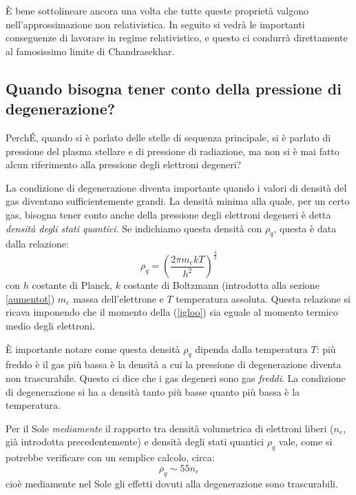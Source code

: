 \smallskip

\`E bene sottolineare ancora una volta che tutte queste propriet\`{a} valgono nell'approssimazione non relativistica. In seguito si vedr\`{a} le importanti conseguenze di lavorare in regime relativistico, e questo ci condurr\`{a} direttamente al famosissimo limite di Chandrasekhar.
\subsection{Quando bisogna tener conto della pressione di degenerazione?}
Perch\'{E}, quando si è parlato delle stelle di sequenza principale, si è parlato di pressione del plasma stellare e di pressione di radiazione, ma non si è mai fatto alcun riferimento alla pressione degli elettroni degeneri?
\par
La condizione di degenerazione diventa importante quando i valori di densit\`{a} del gas diventano sufficientemente grandi.
La densit\`{a} minima alla quale, per un certo gas, bisogna tener conto anche della pressione degli elettroni degeneri è detta \emph{densit\`{a} degli stati quantici}. Se indichiamo questa densit\`{a} con $\rho_{q}$, questa è data dalla relazione:
\begin{equation}
\rho_{q}= \left( \frac{2\pi m_{e} k T}{h^{2}} \right)^{\frac{3}{2}}
\end{equation}
con $h$ costante di Planck, $k$ costante di Boltzmann (introdotta alla sezione \ref{aumentot}) $m_{e}$ massa dell'elettrone e $T$ temperatura assoluta.
Questa relazione si ricava imponendo che il momento della (\ref{igloo}) sia eguale al momento termico medio degli elettroni.
\par
\`E importante notare come questa densit\`{a} $\rho_{q}$ dipenda dalla temperatura $T$: più freddo è il gas più bassa è la densit\`{a} a cui la pressione di degenerazione diventa non trascurabile. Questo ci dice che i gas degeneri sono gas \emph{freddi}. La condizione di degenerazione si ha a densit\`{a} tanto più basse quanto più bassa è la temperatura.
\par
Per il Sole \emph{mediamente} il rapporto tra densit\`{a} volumetrica di elettroni liberi ($n_{e}$, gi\`{a} introdotta precedentemente) e densit\`{a} degli stati quantici $\rho_{q}$ vale, come si potrebbe verificare con un semplice calcolo, circa:
\begin{displaymath}
\rho_{q} \sim 55 n_{e}
\end{displaymath}
cioè mediamente nel Sole gli effetti dovuti alla degenerazione sono trascurabili.
